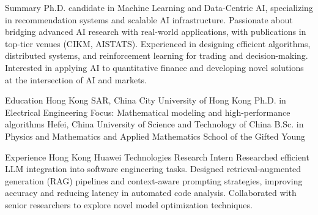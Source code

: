 \documentclass[caps, english]{financecv}
\begin{document}
\begin{cvsection}{Summary}
    Ph.D. candidate in Machine Learning and Data-Centric AI, specializing in recommendation systems and scalable AI infrastructure. Passionate about bridging advanced AI research with real-world applications, with publications in top-tier venues (CIKM, AISTATS). Experienced in designing efficient algorithms, distributed systems, and reinforcement learning for trading and decision-making. Interested in applying AI to quantitative finance and developing novel solutions at the intersection of AI and markets.
\end{cvsection}

\begin{cvsection}{Education}
    {Hong Kong SAR, China}
    {City University of Hong Kong}
    {}
    {Ph.D. in Electrical Engineering}
    {Focus: Mathematical modeling and high-performance algorithms}
    {}
    {}
    {Hefei, China}
    {University of Science and Technology of China}
    {}
    {B.Sc. in Physics and Mathematics and Applied Mathematics}
    {School of the Gifted Young}
    {}
    {}
\end{cvsection}

\begin{cvsection}{Experience}
    {Hong Kong}
    {Huawei Technologies}
    {Research Intern}
    {Researched efficient LLM integration into software engineering tasks. Designed retrieval-augmented generation (RAG) pipelines and context-aware prompting strategies, improving accuracy and reducing latency in automated code analysis. Collaborated with senior researchers to explore novel model optimization techniques.}
    {}
    {}
    {}
\end{cvsection}
\end{document}
